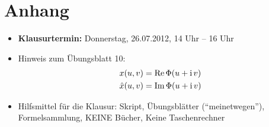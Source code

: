 \chapter*{Anhang}
\begin{itemize}
 \item \textbf{Klausurtermin:} Donnerstag, 26.07.2012, 14 Uhr – 16 Uhr
 \item Hinweis zum Übungsblatt 10:
 \begin{align*}
  x(u,v) &= \operatorname{Re} \Phi(u + \operatorname{i} v) \\
  \hat x(u,v) &= \operatorname{Im} \Phi(u + \operatorname{i} v)
 \end{align*}
 \item Hilfsmittel für die Klausur: Skript, Übungsblätter (``meinetwegen''), Formelsammlung, KEINE Bücher, Keine Taschenrechner
\end{itemize}
